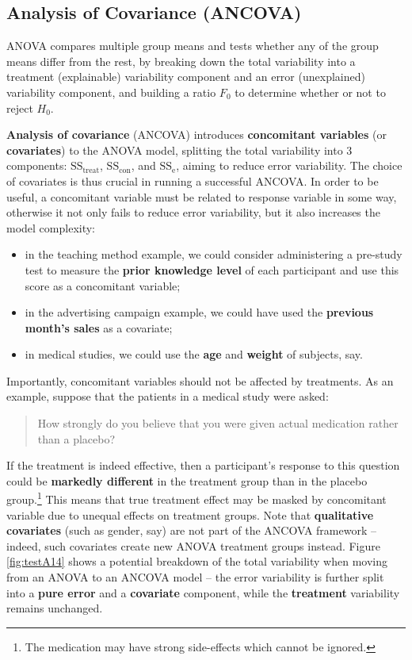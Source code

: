 \subsection{Analysis of Covariance (ANCOVA)}
ANOVA compares multiple group means and tests whether any of the group means differ from the rest, by breaking down the total variability into a treatment (explainable) variability component and an error (unexplained) variability component, and building a ratio $F_0$ to determine whether or not to reject $H_{0}$. \par \textbf{Analysis of covariance} (ANCOVA) introduces \textbf{concomitant variables} (or \textbf{covariates}) to the ANOVA model, splitting the total variability into 3 components: $\text{SS}_{\textrm{treat}}$, $\text{SS}_{\textrm{con}}$, and $\text{SS}_{\textrm{e}}$, aiming to reduce error variability. The choice of covariates is thus crucial in running a successful ANCOVA.
\newl In order to be useful, a concomitant variable must be related to response variable in some way, otherwise it not only fails to reduce error variability, but it also increases the model complexity: 
\begin{itemize}[noitemsep]
\item in the teaching method example, we could consider administering a pre-study test to measure the \textbf{prior knowledge level} of each participant and use this score as a concomitant variable;
\item in the advertising campaign example, we could have used the \textbf{previous month's sales} as a covariate; 
\item in medical studies, we could use the \textbf{age} and \textbf{weight} of subjects, say.\end{itemize} Importantly, concomitant variables should not be affected by treatments. As an example, suppose that the patients in a medical study were asked:  \begin{quote} How strongly do you believe that you were given actual medication rather than a placebo?
\end{quote} If the treatment is indeed effective, then a participant's response to this question could be \textbf{markedly different} in the treatment group than in the  placebo group.\footnote{The medication may have strong side-effects which cannot be ignored.} This means that true treatment effect may be masked by concomitant variable due to unequal effects on treatment groups.
\newl Note that \textbf{qualitative covariates} (such as gender, say) are not part of the ANCOVA framework  -- indeed, such covariates create new ANOVA treatment groups instead. \newpage\noindent Figure \ref{fig:testA14} shows a potential breakdown of the total variability when moving from an ANOVA to an ANCOVA model -- the error variability is further split into a \textbf{pure error}  and a \textbf{covariate} component, while the \textbf{treatment} variability remains unchanged.

